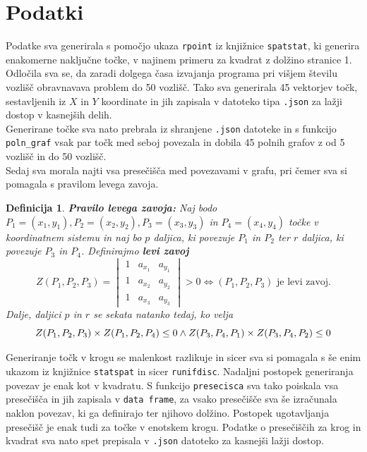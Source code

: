 \documentclass[12pt, a4paper]{article}
\newtheorem{definicija}{Definicija}
\begin{document}
	\section{Podatki}
	Podatke sva generirala s pomočjo ukaza \texttt{rpoint} iz knjižnice \texttt{spatstat}, ki generira enakomerne naključne točke, v najinem primeru za kvadrat z dolžino stranice 1. Odločila sva se, da zaradi dolgega časa izvajanja programa pri višjem številu vozlišč obravnavava problem do 50 vozlišč. Tako sva generirala 45 vektorjev točk, sestavljenih iz $X$ in $Y$ koordinate in jih zapisala v datoteko tipa \texttt{.json} za lažji dostop v kasnejših delih. \\
	Generirane točke sva nato prebrala iz shranjene \texttt{.json} datoteke in s funkcijo \texttt{poln\_graf} vsak par točk med seboj povezala in dobila 45 polnih grafov z od 5 vozlišč in do 50 vozlišč. \\
	Sedaj sva morala najti vsa presečišča med povezavami v grafu, pri čemer sva si pomagala s pravilom levega zavoja.
	\begin{definicija}
		\textbf{Pravilo levega zavoja:} Naj bodo $P_1=(x_1,y_1),P_2=(x_2,y_2),P_3=(x_3,y_3)$ in $P_4=(x_4,y_4)$ točke v koordinatnem sistemu in naj bo $p$ daljica, ki povezuje $P_1$ in $P_2$ ter $r$ daljica, ki povezuje $P_3$ in $P_4$. Definirajmo \textbf{levi zavoj}
		$$Z(P_1,P_2,P_3)=\begin{vmatrix}
			1 & a_{x_1} & a_{y_1}\\ 
			1 & a_{x_2} & a_{y_2}\\
			1 & a_{x_3} & a_{y_3} 
		\end{vmatrix} > 0
	\Leftrightarrow (P_1,P_2,P_3) \text{ je levi zavoj.}$$
	Dalje, daljici $p$ in $r$ se sekata natanko tedaj, ko velja
	$$Z(P_1,P_2,P_3) \times Z(P_1,P_2,P_4) \leq 0 \wedge \\ 
	Z(P_3,P_4,P_1)\times Z(P_3,P_4,P_2)\leq 0$$
	\end{definicija}
	\noindent Generiranje točk v krogu se malenkost razlikuje in sicer sva si pomagala s še enim ukazom iz knjižnice \texttt{statspat} in sicer \texttt{runifdisc}. Nadaljni postopek generiranja povezav je enak kot v kvadratu. 
	\noindent S funkcijo \texttt{presecisca} sva tako poiskala vsa presečišča in jih zapisala v \texttt{data frame}, za vsako presečišče sva še izračunala naklon povezav, ki ga definirajo ter njihovo dolžino. Postopek ugotavljanja presečišč je enak tudi za točke v enotskem krogu. Podatke o presečiščih za krog in kvadrat sva nato spet prepisala v \texttt{.json} datoteko za kasnejši lažji dostop. \\
\end{document}
